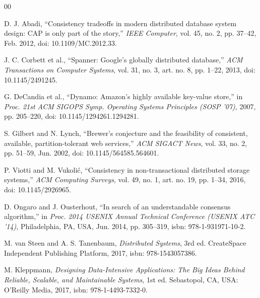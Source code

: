 \documentclass[12pt,letterpaper]{article}
\begin{document}
\begin{thebibliography}{00}

 D. J. Abadi, ``Consistency tradeoffs in modern
distributed database system design: CAP is only part of the story,''
\emph{IEEE Computer}, vol. 45, no. 2, pp. 37--42, Feb. 2012, doi:
10.1109/MC.2012.33.

 J. C. Corbett et al., ``Spanner: Google's globally
distributed database,'' \emph{ACM Transactions on Computer Systems},
vol. 31, no. 3, art. no. 8, pp. 1--22, 2013, doi: 10.1145/2491245.

 G. DeCandia et al., ``Dynamo: Amazon's highly
available key-value store,'' in \emph{Proc. 21st ACM SIGOPS Symp.
Operating Systems Principles (SOSP '07)}, 2007, pp. 205--220, doi:
10.1145/1294261.1294281.

 S. Gilbert and N. Lynch, ``Brewer's conjecture and
the feasibility of consistent, available, partition-tolerant web
services,'' \emph{ACM SIGACT News}, vol. 33, no. 2, pp. 51--59, Jun. 2002,
doi: 10.1145/564585.564601.

 P. Viotti and M. Vukoli\'c, ``Consistency in
non-transactional distributed storage systems,'' \emph{ACM Computing
Surveys}, vol. 49, no. 1, art. no. 19, pp. 1--34, 2016, doi:
10.1145/2926965.

 D. Ongaro and J. Ousterhout, ``In search of an
understandable consensus algorithm,'' in \emph{Proc. 2014 USENIX Annual
Technical Conference (USENIX ATC '14)}, Philadelphia, PA, USA, Jun. 2014,
pp. 305--319, isbn: 978-1-931971-10-2.

 M. van Steen and A. S. Tanenbaum,
\emph{Distributed Systems}, 3rd ed. CreateSpace Independent Publishing
Platform, 2017, isbn: 978-1543057386.

 M. Kleppmann, \emph{Designing Data-Intensive
Applications: The Big Ideas Behind Reliable, Scalable, and Maintainable
Systems}, 1st ed. Sebastopol, CA, USA: O'Reilly Media, 2017, isbn:
978-1-4493-7332-0.

\end{thebibliography}
\end{document}

